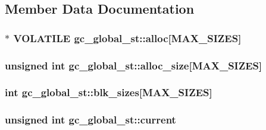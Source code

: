 \subsection{Member Data Documentation}
\hypertarget{structgc__global__st_a23a72ec39eb29dea618d708c334895ec}{
\subsubsection[{alloc}]{$\ast$ {\bf V\-O\-L\-A\-T\-I\-L\-E} gc\-\_\-global\-\_\-st\-::alloc\mbox{[}{\bf M\-A\-X\-\_\-\-S\-I\-Z\-E\-S}\mbox{]}}}\label{structgc__global__st_a23a72ec39eb29dea618d708c334895ec}
\hypertarget{structgc__global__st_ae4f52ed77679e03df34c54304c4ea691}{
\subsubsection[{alloc\-\_\-size}]{ unsigned int gc\-\_\-global\-\_\-st\-::alloc\-\_\-size\mbox{[}{\bf M\-A\-X\-\_\-\-S\-I\-Z\-E\-S}\mbox{]}}}\label{structgc__global__st_ae4f52ed77679e03df34c54304c4ea691}
\hypertarget{structgc__global__st_a40ce20b4e8d128f13d48eead9852acc3}{
\subsubsection[{blk\-\_\-sizes}]{\setlength{\rightskip}{0pt plus 5cm}int gc\-\_\-global\-\_\-st\-::blk\-\_\-sizes\mbox{[}{\bf M\-A\-X\-\_\-\-S\-I\-Z\-E\-S}\mbox{]}}}\label{structgc__global__st_a40ce20b4e8d128f13d48eead9852acc3}
\hypertarget{structgc__global__st_ae4b23512b173dbd7f9125411b4d8c000}{
\subsubsection[{current}]{ unsigned int gc\-\_\-global\-\_\-st\-::current}}\label{structgc__global__st_ae4b23512b173dbd7f9125411b4d8c000}
